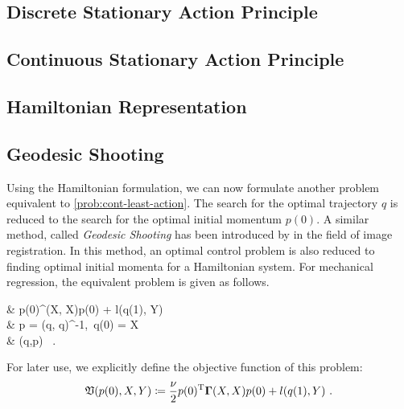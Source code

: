 \subsection{Discrete Stationary Action Principle}



\subsection{Continuous Stationary Action Principle}



\subsection{Hamiltonian Representation}



\subsection{Geodesic Shooting}

Using the Hamiltonian formulation, we can now formulate another problem equivalent to \cref{prob:cont-least-action}.
The search for the optimal trajectory $q$ is reduced to the search for the optimal initial momentum $p(0)$.
A similar method, called \emph{Geodesic Shooting} has been introduced by \citet{allassonniere05} in the field of image registration.
In this method, an optimal control problem is also reduced to finding optimal initial momenta for a Hamiltonian system.
For mechanical regression, the equivalent problem is given as follows.
\begin{problem}
	\label{prob:geodesic-shooting}
	\begin{cases}
		&  p(0)^\T \bGamma(X, X)p(0) + l(q(1), Y)\\
		 & p = \bGamma(q, q)^{-1},\ q(0) = X \\
		& (q,p)  \ .
	\end{cases}
\end{problem}
For later use, we explicitly define the objective function of this problem:
\begin{equation}
\label{eq:geodesic-shooting-objective}
\mathfrak{V}(p(0), X, Y) \coloneqq \frac{\nu}{2} p(0)^{\mathrm{T}} \mathbf{\Gamma}(X, X)p(0) + l(q(1), Y) \ .
\end{equation}

